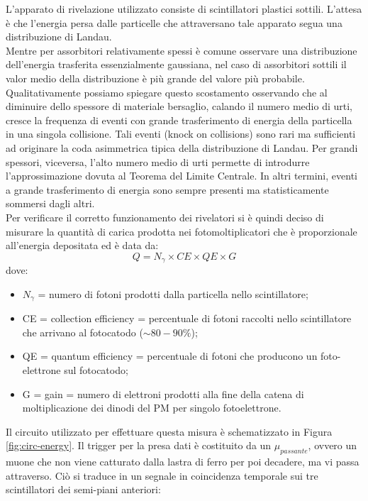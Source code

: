 L'apparato di rivelazione utilizzato consiste di scintillatori plastici sottili. L'attesa \`e che l'energia persa dalle particelle che attraversano tale apparato segua una distribuzione di Landau.\\
Mentre per assorbitori relativamente spessi \`e comune osservare una distribuzione dell'energia trasferita essenzialmente gaussiana, nel caso di assorbitori sottili il valor medio della distribuzione \`e pi\`u grande del valore pi\`u probabile. Qualitativamente possiamo spiegare questo
scostamento osservando che al diminuire dello spessore di materiale bersaglio, calando il numero medio di urti, cresce la frequenza di eventi con grande trasferimento di energia della particella in una singola collisione. Tali eventi (knock on collisions) sono rari ma sufficienti ad
originare la coda asimmetrica tipica della distribuzione di Landau.
Per grandi spessori, viceversa, l'alto numero medio di urti permette di introdurre l'approssimazione dovuta al Teorema del Limite Centrale. In altri termini, eventi a grande trasferimento di energia sono sempre presenti ma statisticamente sommersi dagli altri.\\
Per verificare il corretto funzionamento dei rivelatori si \`e quindi deciso di misurare la quantit\`a di carica prodotta nei fotomoltiplicatori che \`e proporzionale all'energia depositata ed \`e data da:
\begin{equation}
Q=N_{\gamma}\times CE \times QE \times G
\end{equation}
dove:
\begin{itemize}
	\item $N_{\gamma}$ = numero di fotoni prodotti dalla particella nello scintillatore;
	\item CE = collection efficiency = percentuale di fotoni raccolti nello scintillatore che arrivano al fotocatodo ($\sim 80-90 \%$);
	\item QE = quantum efficiency = percentuale di fotoni che producono un foto-elettrone sul fotocatodo;
  \item G = gain = numero di elettroni prodotti alla fine della catena di moltiplicazione dei dinodi del PM per singolo fotoelettrone.
\end{itemize}
Il circuito utilizzato per effettuare questa misura \`e schematizzato in Figura \ref{fig:circ-energy}. Il trigger per la presa dati \`e costituito da un $\mu_{passante}$, ovvero un muone che non viene catturato dalla lastra di ferro per poi decadere, ma vi passa attraverso. Ci\`o si traduce in un segnale in coincidenza temporale sui tre scintillatori dei semi-piani anteriori:
